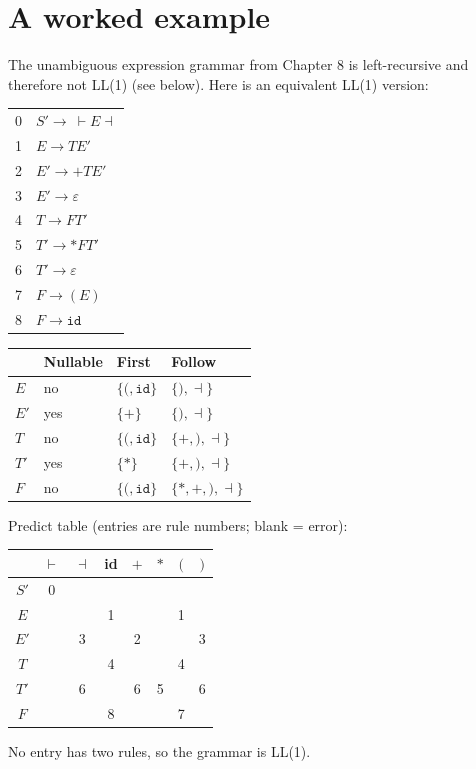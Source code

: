 \section{A worked example}

The unambiguous expression grammar from Chapter 8 is left-recursive and therefore not LL(1)
(see below). Here is an equivalent LL(1) version:
\begin{center}
\begin{tabular}{rl}
0 & $S' \to\ \vdash E \dashv$ \\
1 & $E \to T E'$ \\
2 & $E' \to + T E'$ \\
3 & $E' \to \varepsilon$ \\
4 & $T \to F T'$ \\
5 & $T' \to * F T'$ \\
6 & $T' \to \varepsilon$ \\
7 & $F \to ( E )$ \\
8 & $F \to \mathtt{id}$
\end{tabular}
\end{center}

\begin{center}
\begin{tabular}{llll}
\toprule
 & Nullable & First & Follow \\
\midrule
$E$  & no  & $\{(, \mathtt{id}\}$ & $\{), \dashv\}$ \\
$E'$ & yes & $\{+\}$ & $\{), \dashv\}$ \\
$T$  & no  & $\{(, \mathtt{id}\}$ & $\{+, ), \dashv\}$ \\
$T'$ & yes & $\{*\}$ & $\{+, ), \dashv\}$ \\
$F$  & no  & $\{(, \mathtt{id}\}$ & $\{*, +, ), \dashv\}$ \\
\bottomrule
\end{tabular}
\end{center}

Predict table (entries are rule numbers; blank = error):
\begin{center}
\begin{tabular}{c|ccccccc}
 & $\vdash$ & $\dashv$ & id & $+$ & $*$ & $($ & $)$ \\
\hline
$S'$ & 0 & & & & & & \\
$E$  & & & 1 & & & 1 & \\
$E'$ & & 3 & & 2 & & & 3 \\
$T$  & & & 4 & & & 4 & \\
$T'$ & & 6 & & 6 & 5 & & 6 \\
$F$  & & & 8 & & & 7 & \\
\end{tabular}
\end{center}
No entry has two rules, so the grammar is LL(1).

